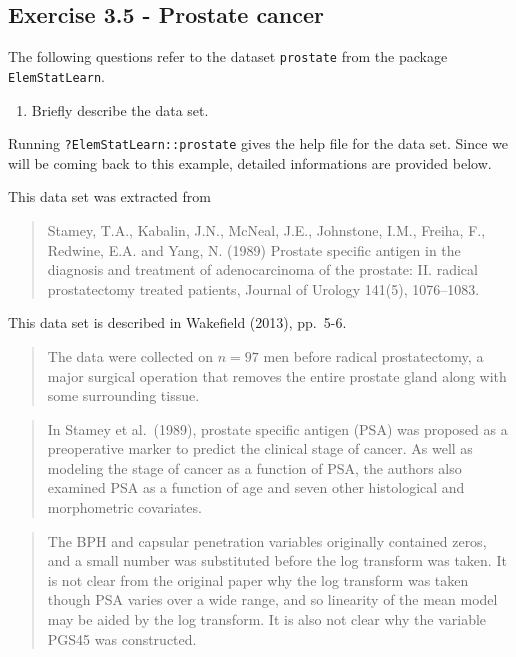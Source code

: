 \documentclass[]{book}
\providecommand{\tightlist}{%
  \setlength{\itemsep}{0pt}\setlength{\parskip}{0pt}}
\theoremstyle{definition}
\theoremstyle{definition}
\theoremstyle{definition}
\theoremstyle{remark}
\begin{document}
\hypertarget{exercise-3.5---prostate-cancer}{%
\subsection{Exercise 3.5 - Prostate cancer}\label{exercise-3.5---prostate-cancer}}

The following questions refer to the dataset \texttt{prostate} from the package \texttt{ElemStatLearn}.

\begin{enumerate}
\def\labelenumi{\alph{enumi}.}
\tightlist
\item
  Briefly describe the data set.
\end{enumerate}

Running \texttt{?ElemStatLearn::prostate} gives the help file for the data set. Since we will be coming back to this example, detailed informations are provided below.

This data set was extracted from

\begin{quote}
Stamey, T.A., Kabalin, J.N., McNeal, J.E., Johnstone, I.M., Freiha, F., Redwine, E.A. and Yang, N. (1989)
Prostate specific antigen in the diagnosis and treatment of adenocarcinoma of the prostate: II. radical prostatectomy treated
patients, Journal of Urology 141(5), 1076--1083.
\end{quote}

This data set is described in Wakefield (2013), pp.~5-6.

\begin{quote}
The data were collected on \(n=97\) men before radical prostatectomy, a major surgical operation that
removes the entire prostate gland along with some surrounding tissue.
\end{quote}

\begin{quote}
In Stamey et al.~(1989), prostate specific antigen
(PSA) was proposed as a preoperative marker to predict the clinical stage of cancer. As well as modeling the stage of cancer as a
function of PSA, the authors also examined PSA as a function of age and seven other histological and morphometric covariates.
\end{quote}

\begin{quote}
The BPH and capsular penetration variables originally contained zeros, and a small number was substituted before the log transform was taken. It is not clear from the original paper why the log transform was taken though PSA varies over a wide range, and so linearity
of the mean model may be aided by the log transform. It is also not clear why the variable PGS45 was constructed.
\end{quote}
\end{document}
